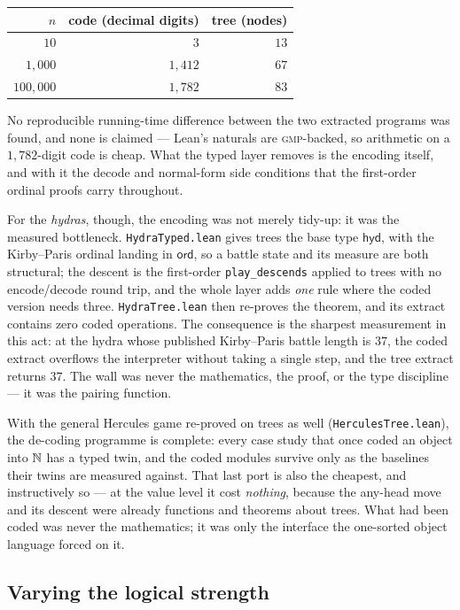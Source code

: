 \begin{center}\small
\begin{tabular}{rrr}
\toprule
$n$ & code (decimal digits) & tree (nodes)\\
\midrule
$10$ & $3$ & $13$\\
$1{,}000$ & $1{,}412$ & $67$\\
$100{,}000$ & $1{,}782$ & $83$\\
\bottomrule
\end{tabular}
\end{center}

No reproducible running-time difference between the two extracted programs
was found, and none is claimed --- Lean's naturals are \textsc{gmp}-backed,
so arithmetic on a $1{,}782$-digit code is cheap. What the typed layer
removes is the encoding itself, and with it the decode and normal-form side
conditions that the first-order ordinal proofs carry throughout.

For the \emph{hydras}, though, the encoding was not merely tidy-up: it was
the measured bottleneck. \texttt{HydraTyped.lean} gives trees the base type
$\mathsf{hyd}$, with the Kirby--Paris ordinal landing in $\mathsf{ord}$, so
a battle state and its measure are both structural; the descent is the
first-order \texttt{play\_descends} applied to trees with no encode/decode
round trip, and the whole layer adds \emph{one} rule where the coded version
needs three. \texttt{HydraTree.lean} then re-proves the theorem, and its
extract contains zero coded operations. The consequence is the sharpest
measurement in this act: at the hydra whose published Kirby--Paris battle
length is $37$, the coded extract overflows the interpreter without taking a
single step, and the tree extract returns $37$. The wall was never the
mathematics, the proof, or the type discipline --- it was the pairing
function.

With the general Hercules game re-proved on trees as well
(\texttt{HerculesTree.lean}), the de-coding programme is complete: every
case study that once coded an object into $\mathbb{N}$ has a typed twin, and the
coded modules survive only as the baselines their twins are measured
against. That last port is also the cheapest, and instructively so --- at
the value level it cost \emph{nothing}, because the any-head move and its
descent were already functions and theorems about trees. What had been
coded was never the mathematics; it was only the interface the one-sorted
object language forced on it.

\subsection*{Varying the logical strength}

